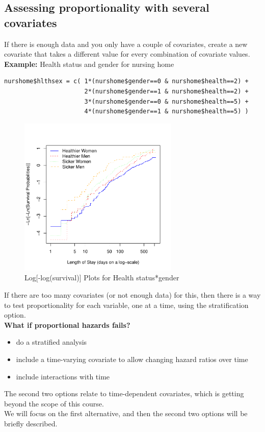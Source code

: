 \documentclass[11pt,psfig]{book}
\begin{document}
\subsection{Assessing proportionality with several covariates}
If there is enough data and you only have a couple of
covariates, create a new covariate that takes a different value for
every combination of covariate values.
\\[2ex]
{\bf Example:} Health status and gender for nursing home
\small
\begin{verbatim}
nurshome$hlthsex = c( 1*(nurshome$gender==0 & nurshome$health==2) +
                      2*(nurshome$gender==1 & nurshome$health==2) +
                      3*(nurshome$gender==0 & nurshome$health==5) +
                      4*(nurshome$gender==1 & nurshome$health==5) )
\end{verbatim}
\normalsize
\begin{figure}[ht]
\caption{\normalsize Log[-log(survival)] Plots for Health status*gender}
\centerline{\includegraphics[width=3in]{ch12ph_hlthsex.pdf}}
\end{figure}
\normalsize
If there are too many covariates (or not enough data) for
this, then there is a way to test proportionality for
each variable, one at a time, using the stratification option.
\\[2ex]
{\bf What if proportional hazards fails?}
\begin{itemize}
\item do a stratified analysis

\item include a time-varying covariate to
       allow changing  hazard ratios over time

\item include interactions with time
\end{itemize}
The second two options relate to time-dependent covariates,
which is getting beyond the scope of this course.
\\[2ex]
We will focus on the first alternative, and then the second
two options will be briefly described.
\end{document}
